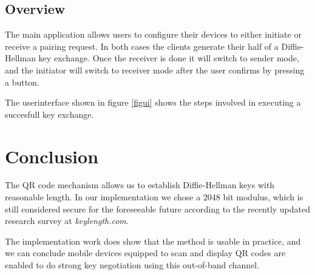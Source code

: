 \documentclass[conference, 11pt]{sty/IEEEtran}
\begin{document}
\subsection{Overview}
\label{ssec:overview}
The main application allows users to configure their devices to either initiate or receive a pairing request.
In both cases the clients generate their half of a Diffie-Hellman key exchange.
Once the receiver is done it will switch to sender mode, and the initiator will switch to receiver mode after the user confirms by pressing a button.

The userinterface shown in figure \ref{figui} shows the steps involved in executing a succesfull key exchange.

\section{Conclusion}
\label{sec:conclusion}
The QR code mechanism allows us to establish Diffie-Hellman keys with reasonable length. In our implementation we chose a 2048 bit modulus, which is still considered secure for the foreseeable future according to the recently updated research survey at \textit{keylength.com}\cite{keylengthdotcom}.

The implementation work does show that the method is usable in practice, and we can conclude mobile devices equipped to scan and display QR codes are enabled to do strong key negotiation using this out-of-band channel.

\newpage
\end{document}
